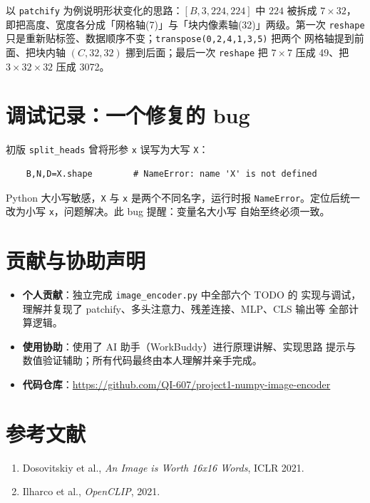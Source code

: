 \documentclass[11pt]{ctexart}
\begin{document}
以 \texttt{patchify} 为例说明形状变化的思路：$[B,3,224,224]$ 中 $224$ 被拆成
$7\times32$，即把高度、宽度各分成「网格轴(7)」与「块内像素轴(32)」两级。第一次
\texttt{reshape} 只是重新贴标签、数据顺序不变；\texttt{transpose(0,2,4,1,3,5)} 把两个
网格轴提到前面、把块内轴 $(C,32,32)$ 挪到后面；最后一次 \texttt{reshape} 把
$7\times7$ 压成 49、把 $3\times32\times32$ 压成 3072。

\section{调试记录：一个修复的 bug}

初版 \texttt{split\_heads} 曾将形参 \texttt{x} 误写为大写 \texttt{X}：

\begin{verbatim}
    B,N,D=X.shape        # NameError: name 'X' is not defined
\end{verbatim}

Python 大小写敏感，\texttt{X} 与 \texttt{x} 是两个不同名字，运行时报
\texttt{NameError}。定位后统一改为小写 \texttt{x}，问题解决。此 bug 提醒：变量名大小写
自始至终必须一致。

\section{贡献与协助声明}

\begin{itemize}
  \item \textbf{个人贡献}：独立完成 \texttt{image\_encoder.py} 中全部六个 TODO 的
        实现与调试，理解并复现了 patchify、多头注意力、残差连接、MLP、CLS 输出等
        全部计算逻辑。
  \item \textbf{使用协助}：使用了 AI 助手（WorkBuddy）进行原理讲解、实现思路
        提示与数值验证辅助；所有代码最终由本人理解并亲手完成。
  \item \textbf{代码仓库}：\url{https://github.com/QI-607/project1-numpy-image-encoder}
\end{itemize}

\section*{参考文献}

\begin{enumerate}
  \item Dosovitskiy et al., \emph{An Image is Worth 16x16 Words}, ICLR 2021.
  \item Ilharco et al., \emph{OpenCLIP}, 2021.
\end{enumerate}
\end{document}

